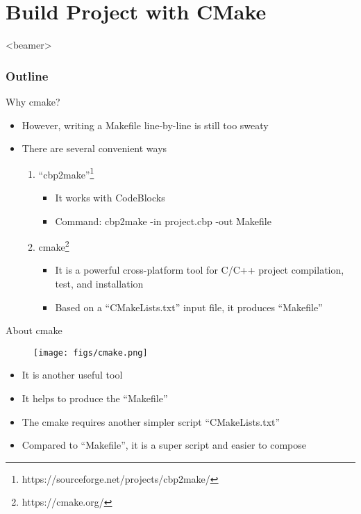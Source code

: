 \section{Build Project with CMake}
\label{sec:cmake}
\begin{frame}<beamer>
    \frametitle{Outline}
    \tableofcontents[currentsection]
\end{frame}

\begin{frame}{Why cmake?}
\vspace{0.3in}
\begin{itemize}
	\item {However, writing a Makefile line-by-line is still too sweaty}
	\item {There are several convenient ways}
	\begin{enumerate}
			\item {``cbp2make''\footnote{https://sourceforge.net/projects/cbp2make/}}
			\begin{itemize}
				\item {It works with CodeBlocks}
					\vspace{0.15in}
				\item {Command: cbp2make -in project.cbp -out Makefile}
			\end{itemize}
				\vspace{0.15in}
			\item {cmake\footnote{https://cmake.org/}}
			\begin{itemize}
				\item {It is a powerful cross-platform tool for C/C++ project compilation, test, and installation}
					\vspace{0.15in}
				\item {Based on a ``CMakeLists.txt'' input file, it produces ``Makefile''}
			\end{itemize}
	\end{enumerate}
\end{itemize}

\end{frame}

\begin{frame}{About cmake}
\vspace{0.2in}
\begin{figure}
	\begin{center}
		\texttt{[image: figs/cmake.png]}
	\end{center}
\end{figure}
\begin{itemize}
	\item {It is another useful tool}
	\vspace{0.15in}
	\item {It helps to produce the ``Makefile''}
	\vspace{0.15in}
	\item {The cmake requires another simpler script ``CMakeLists.txt''}
	\vspace{0.15in}
	\item {Compared to ``Makefile'', it is a super script and easier to compose}
\end{itemize}
\end{frame}

